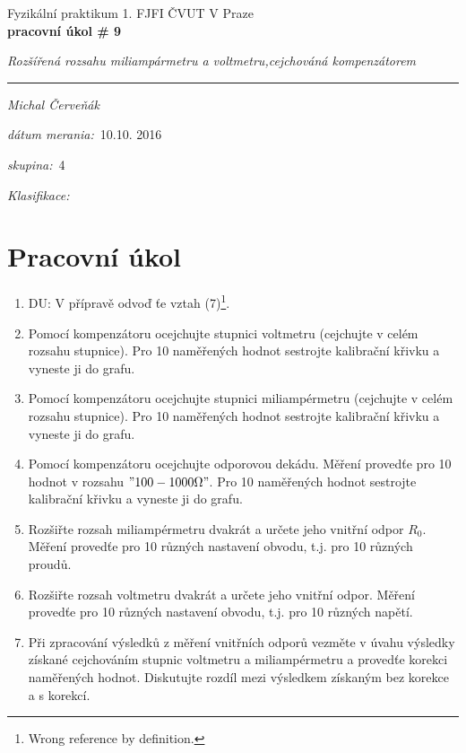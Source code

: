 \documentclass[a4paper,10pt]{article}
\begin{document}
\def\mean#1{\left< #1 \right>}
\noindent
{\large Fyzikální praktikum 1.} \hfil {\large FJFI ČVUT V Praze}\\
\noindent
{\large\textbf{pracovní úkol \# 9}}
\begin{center}
{\large\textit{Rozšířená rozsahu miliampármetru a voltmetru,cejchováná kompenzátorem}}
\end{center}
\noindent
\rule{\textwidth}{1px}
\vspace{\baselineskip}

\emph{Michal Červeňák}
\par
\vspace{\baselineskip}
\begin{minipage}[l]{0.5\textwidth}%
\textit{dátum merania:}~10.10. 2016\\%
\par%
\noindent%
\textit{skupina:}~4\\%
\par%
\noindent%
\textit{Klasifikace:}\dotfill\\%
\end{minipage}

\section{Pracovní úkol}

\begin{enumerate}
\item DU: V přípravě odvoď ťe vztah (7)\footnote{Wrong reference by definition.}.
\item Pomocí kompenzátoru ocejchujte stupnici voltmetru (cejchujte v celém rozsahu stupnice). Pro 10 naměřených hodnot sestrojte kalibrační křivku a vyneste ji do grafu.
\item Pomocí kompenzátoru ocejchujte stupnici miliampérmetru (cejchujte v celém rozsahu stupnice). Pro 10 naměřených hodnot sestrojte kalibrační křivku a vyneste ji do grafu.
\item Pomocí kompenzátoru ocejchujte odporovou dekádu. Měření provedťe pro 10 hodnot v rozsahu $"100-1000 \Omega"$. Pro 10 naměřených hodnot sestrojte kalibrační křivku a vyneste ji do grafu.
\item Rozšiřte rozsah miliampérmetru dvakrát a určete jeho vnitřní odpor $R_0$. Měření provedťe pro
10 různých nastavení obvodu, t.j. pro 10 různých proudů.
\item Rozšiřte rozsah voltmetru dvakrát a určete jeho vnitřní odpor. Měření provedťe pro 10 různých
nastavení obvodu, t.j. pro 10 různých napětí.
\item Při zpracování výsledků z měření vnitřních odporů vezměte v úvahu výsledky získané cejchováním
stupnic voltmetru a miliampérmetru a provedťe korekci naměřených hodnot. Diskutujte
rozdíl mezi výsledkem získaným bez korekce a s korekcí.
\end{enumerate}
\end{document}
